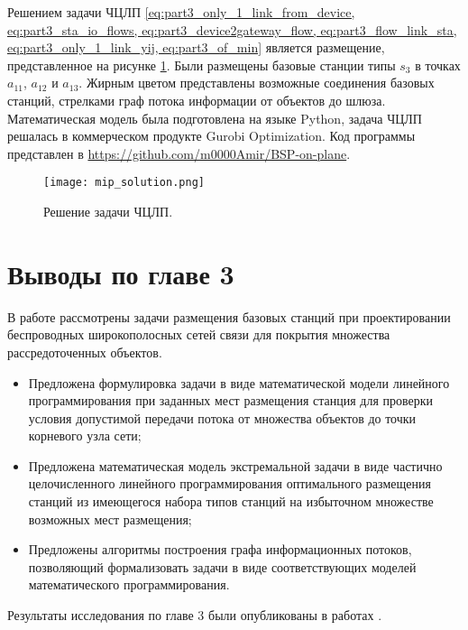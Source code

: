 Решением задачи ЧЦЛП \cref{eq:part3_only_1_link_from_device, eq:part3_sta_io_flows, eq:part3_device2gateway_flow, eq:part3_flow_link_sta, eq:part3_only_1_link_yij, eq:part3_of_min} является размещение, представленное на рисунке \cref{fig:part3_mip_solution}. Были размещены базовые станции типы $s_3$ в точках $a_11$, $a_12$ и $a_13$. Жирным цветом представлены возможные соединения базовых станций, стрелками граф потока информации от объектов до шлюза. Математическая модель была подготовлена на языке Python, задача ЧЦЛП решалась в коммерческом продукте Gurobi Optimization.  Код программы представлен в \url{https://github.com/m0000Amir/BSP-on-plane}.

\begin{figure}[hbt!]
    \centering
     \texttt{[image: mip\_solution.png]}
  \caption{Решение задачи ЧЦЛП.}
  \label{fig:part3_mip_solution}
\end{figure}

\FloatBarrier
\section{Выводы по главе 3}

В работе рассмотрены задачи размещения базовых станций при проектировании беспроводных широкополосных сетей связи для покрытия множества рассредоточенных объектов. 
\begin{itemize}
    \item Предложена формулировка задачи в виде математической модели линейного программирования при заданных мест размещения станция для проверки условия допустимой передачи потока от множества объектов до точки корневого узла сети;
    \item Предложена математическая модель экстремальной задачи в виде частично целочисленного линейного программирования оптимального размещения станций из имеющегося набора типов станций на избыточном множестве возможных мест размещения;
    \item Предложены алгоритмы построения графа информационных потоков, позволяющий формализовать задачи в виде соответствующих моделей математического программирования. 
\end{itemize}

Результаты исследования по главе 3 были опубликованы в работах \cite{MukhtarovPershinGUBKIN2018_RSCI, 
MukhtarovPershinGUBKIN2019_RSCI,MukhtarovPershinVSPU2019_RSCI, MukhtarovPershinMLSD2019works_RSCI, MukhtarovPershinMLSD2019materials_RSCI,}. 







\FloatBarrier
